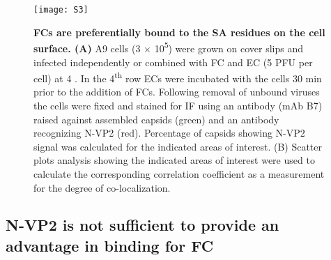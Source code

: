 \begin{figure}
\centering
  \texttt{[image: S3]}
  \caption[FCs are preferentially bound to the SA residues on the cell surface.]
   {\textbf{FCs are preferentially bound to the SA residues on the cell surface. (A)} A9 cells (3 $\times$ 10\textsuperscript{5}) were grown on cover slips and infected independently or combined with FC and EC (5 PFU per cell) at 4 \textcelsius. In the 4\textsuperscript{th} row ECs were incubated with the cells 30 min prior to the addition of FCs. Following removal of unbound viruses the cells were fixed and stained for IF using an antibody (mAb B7) raised against assembled capsids (green) and an antibody recognizing N-VP2 (red). Percentage of capsids showing N-VP2 signal was calculated for the indicated areas of interest. (B) Scatter plots analysis showing the indicated areas of interest were used to calculate the corresponding correlation coefficient as a measurement for the degree of co-localization.} 
\label{S3}
\end{figure}



\subsection{N-VP2 is not sufficient to provide an advantage in binding for FC}

